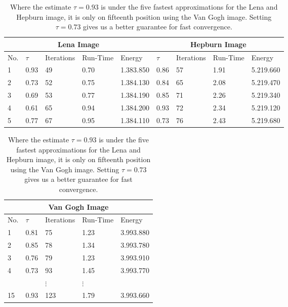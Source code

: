        \begin{table}
            \parbox{.9\linewidth}{
            \centering
                \begin{tabular}{| l | l | l | l | l | l | l | l | l |}
                    \hline
                    \multicolumn{5}{|c|}{Lena Image} & \multicolumn{4}{|c|}{Hepburn Image} \\ \hline\hline
                    No. & $\tau$ & Iterations & Run-Time & Energy & $\tau$ & Iterations & Run-Time & Energy \\ \hline
                    1 & 0.93 & 49 & 0.70 & 1.383.850 & 0.86 & 57 & 1.91 & 5.219.660 \\ \hline
                    2 & 0.73 & 52 & 0.75 & 1.384.130 & 0.84 & 65 & 2.08 & 5.219.470 \\ \hline
                    3 & 0.69 & 53 & 0.77 & 1.384.190 & 0.85 & 71 & 2.26 & 5.219.340 \\ \hline
                    4 & 0.61 & 65 & 0.94 & 1.384.200 & 0.93 & 72 & 2.34 & 5.219.120 \\ \hline
                    5 & 0.77 & 67 & 0.95 & 1.384.110 & 0.73 & 76 & 2.43 & 5.219.680 \\ \hline
                \end{tabular}
            }
            \hfill
            \parbox{\linewidth}{
            \centering
                \begin{tabular}{| l | l | l | l | l |}
                    \hline
                    \multicolumn{5}{|c|}{Van Gogh Image} \\ \hline\hline
                    No. & $\tau$ & Iterations & Run-Time & Energy \\ \hline
                    1 & 0.81 & 75 & 1.23 & 3.993.880 \\ \hline
                    2 & 0.85 & 78 & 1.34 & 3.993.780 \\ \hline
                    3 & 0.76 & 79 & 1.23 & 3.993.910 \\ \hline
                    4 & 0.73 & 93 & 1.45 & 3.993.770 \\ \hline
                     & & $\vdots$ & $\vdots$ & \\ \hline
                    15 & 0.93 & 123 & 1.79 & 3.993.660 \\ \hline
                \end{tabular}
            }
            \caption[My table caption for ROF and tau.]{Where the estimate $\tau = 0.93$ is under the five fastest approximations for the Lena and Hepburn image, it is only on fifteenth position using the Van Gogh image. Setting $\tau = 0.73$ gives us a better guarantee for fast convergence.}
            \label{tab:best_tau_compare}
        \end{table}

